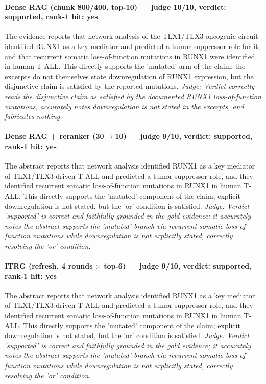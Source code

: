 \documentclass[sigconf, review, anonymous]{acmart}
\begin{document}
\paragraph{Dense RAG (chunk 800/400, top-10) --- judge 10/10, verdict: supported, rank-1 hit: yes}
\noindent The evidence reports that network analysis of the TLX1/TLX3 oncogenic circuit identified RUNX1 as a key mediator and predicted a tumor-suppressor role for it, and that recurrent somatic loss-of-function mutations in RUNX1 were identified in human T-ALL. This directly supports the 'mutated' arm of the claim; the excerpts do not themselves state downregulation of RUNX1 expression, but the disjunctive claim is satisfied by the reported mutations.
\noindent\small\textit{Judge: Verdict correctly reads the disjunctive claim as satisfied by the documented RUNX1 loss-of-function mutations, accurately notes downregulation is not stated in the excerpts, and fabricates nothing.}
\paragraph{Dense RAG + reranker (30$\to$10) --- judge 9/10, verdict: supported, rank-1 hit: yes}
\noindent The abstract reports that network analysis identified RUNX1 as a key mediator of TLX1/TLX3-driven T-ALL and predicted a tumor-suppressor role, and they identified recurrent somatic loss-of-function mutations in RUNX1 in human T-ALL. This directly supports the 'mutated' component of the claim; explicit downregulation is not stated, but the 'or' condition is satisfied.
\noindent\small\textit{Judge: Verdict 'supported' is correct and faithfully grounded in the gold evidence; it accurately notes the abstract supports the 'mutated' branch via recurrent somatic loss-of-function mutations while downregulation is not explicitly stated, correctly resolving the 'or' condition.}
\paragraph{ITRG (refresh, 4 rounds $\times$ top-6) --- judge 9/10, verdict: supported, rank-1 hit: yes}
\noindent The abstract reports that network analysis identified RUNX1 as a key mediator of TLX1/TLX3-driven T-ALL and predicted a tumor-suppressor role, and they identified recurrent somatic loss-of-function mutations in RUNX1 in human T-ALL. This directly supports the 'mutated' component of the claim; explicit downregulation is not stated, but the 'or' condition is satisfied.
\noindent\small\textit{Judge: Verdict 'supported' is correct and faithfully grounded in the gold evidence; it accurately notes the abstract supports the 'mutated' branch via recurrent somatic loss-of-function mutations while downregulation is not explicitly stated, correctly resolving the 'or' condition.}
\end{document}
